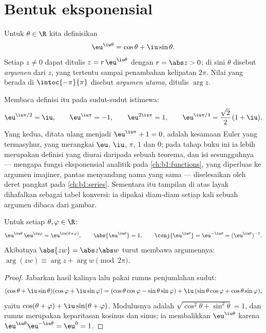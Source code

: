 \section{Bentuk eksponensial}

\begin{definition}\label{def:b1:complex:expi}
Untuk $\theta \in \R$ kita definisikan
\[
\eu^{\iu\theta} = \cos\theta + \iu \sin\theta .
\]
Setiap $z \neq 0$ dapat ditulis $z = r\,\eu^{\iu\theta}$ dengan $r =
\abs z > 0$; di sini $\theta$ disebut \emph{argumen} dari $z$,
yang tertentu sampai penambahan kelipatan $2\pi$. Nilai yang berada di
$\intoc{-\pi}{\pi}$ disebut \emph{argumen utama}, ditulis
$\arg z$.
\end{definition}

\begin{example}\label{ex:b1:complex:eulerid}
Membaca definisi itu pada sudut-sudut istimewa:
\[
\eu^{\iu\pi/2} = \iu, \qquad
\eu^{\iu\pi} = -1, \qquad
\eu^{2\iu\pi} = 1, \qquad
\eu^{\iu\pi/4} = \frac{\sqrt2}2\,(1 + \iu) .
\]
Yang kedua, ditata ulang menjadi $\eu^{\iu\pi} + 1 = 0$, adalah kesamaan
Euler yang termasyhur, yang merangkai $\eu$, $\iu$, $\pi$, $1$ dan $0$; pada
tahap buku ini ia lebih merupakan definisi yang diurai daripada sebuah
teorema, dan isi sesungguhnya --- mengapa fungsi eksponensial analitik
pada \cref{ch:b1:functions}, yang diperluas ke argumen imajiner,
pantas menyandang nama yang sama --- diselesaikan oleh deret pangkat
pada \cref{ch:b1:series}. Sementara itu tampilan di atas
layak dihafalkan sebagai tabel konversi: ia dipakai diam-diam setiap
kali sebuah argumen dibaca dari gambar.
\end{example}

\begin{theorem}\label{thm:b1:complex:funceq}
Untuk setiap $\theta, \varphi \in \R$:
\[
\eu^{\iu\theta}\, \eu^{\iu\varphi} = \eu^{\iu(\theta + \varphi)},
\qquad
\abs{\eu^{\iu\theta}} = 1,
\qquad
\conj{\eu^{\iu\theta}} = \eu^{-\iu\theta} = (\eu^{\iu\theta})^{-1}.
\]
Akibatnya $\abs{zw} = \abs z \abs w$ turut membawa argumennya:
$\arg(zw) \equiv \arg z + \arg w \pmod{2\pi}$.
\end{theorem}

\begin{proof}
Jabarkan hasil kalinya lalu pakai rumus penjumlahan sudut:
\[
(\cos\theta + \iu\sin\theta)(\cos\varphi + \iu\sin\varphi)
= (\cos\theta\cos\varphi - \sin\theta\sin\varphi)
+ \iu\,(\sin\theta\cos\varphi + \cos\theta\sin\varphi),
\]
yaitu $\cos(\theta+\varphi) + \iu\sin(\theta+\varphi)$. Modulusnya
adalah $\sqrt{\cos^2\theta + \sin^2\theta} = 1$, dan rumus 
merupakan keparitasan kosinus dan sinus; ia membalikkan $\eu^{\iu\theta}$ karena
$\eu^{\iu\theta}\eu^{-\iu\theta} = \eu^0 = 1$.
\end{proof}

